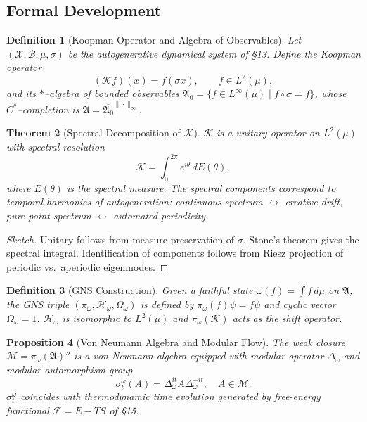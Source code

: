\documentclass[12pt,a4paper,twoside,openright]{book}
\newtheorem{theorem}{Theorem}
\newtheorem{proposition}[theorem]{Proposition}
\newtheorem{definition}[theorem]{Definition}
\begin{document}
\subsection*{Formal Development}

\begin{definition}[Koopman Operator and Algebra of Observables]
Let $(\mathcal{X},\mathcal{B},\mu,\sigma)$ be the autogenerative dynamical system of §13.  
Define the \emph{Koopman operator}
\[
(\mathcal{K}f)(x)=f(\sigma x), \qquad f\in L^2(\mu),
\]
and its $*$--algebra of bounded observables
\(
\mathfrak{A}_0=\{f\in L^\infty(\mu)\mid f\circ\sigma=f\}
\),
whose $C^*$--completion is $\mathfrak{A}=\overline{\mathfrak{A}_0}^{\|\cdot\|_\infty}$.
\end{definition}

\begin{theorem}[Spectral Decomposition of $\mathcal{K}$]
\label{thm:spectral}
$\mathcal{K}$ is a unitary operator on $L^2(\mu)$ with spectral resolution
\[
\mathcal{K}=\int_{0}^{2\pi} e^{i\theta}\,dE(\theta),
\]
where $E(\theta)$ is the spectral measure.  
The spectral components correspond to temporal harmonics of autogeneration:  
continuous spectrum $\leftrightarrow$ creative drift,  
pure point spectrum $\leftrightarrow$ automated periodicity.
\end{theorem}

\begin{proof}[Sketch]
Unitary follows from measure preservation of $\sigma$.  
Stone’s theorem gives the spectral integral.  
Identification of components follows from Riesz projection of periodic vs.\ aperiodic eigenmodes.
\end{proof}

\begin{definition}[GNS Construction]
Given a faithful state $\omega(f)=\int f\,d\mu$ on $\mathfrak{A}$,  
the GNS triple $(\pi_\omega,\mathcal{H}_\omega,\Omega_\omega)$
is defined by $\pi_\omega(f)\psi = f\psi$ and cyclic vector $\Omega_\omega=1$.  
$\mathcal{H}_\omega$ is isomorphic to $L^2(\mu)$ and $\pi_\omega(\mathcal{K})$ acts as the shift operator.
\end{definition}

\begin{proposition}[Von Neumann Algebra and Modular Flow]
The weak closure $\mathcal{M}=\pi_\omega(\mathfrak{A})''$ is a von Neumann algebra equipped with modular operator $\Delta_\omega$ and modular automorphism group
\[
\sigma_t^\omega(A)=\Delta_\omega^{it}A\Delta_\omega^{-it},\quad A\in\mathcal{M}.
\]
$\sigma_t^\omega$ coincides with thermodynamic time evolution generated by free-energy functional $\mathcal{F}=E-TS$ of §15.
\end{proposition}
\end{document}
